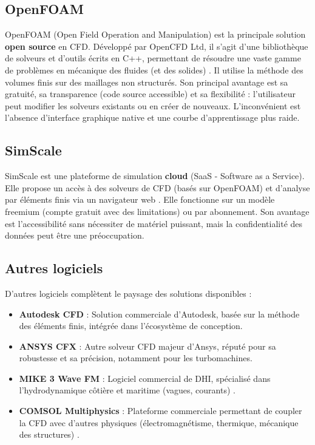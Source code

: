\subsection{OpenFOAM}
\label{subsec:openfoam}

OpenFOAM (Open Field Operation and Manipulation) est la principale solution \textbf{open source} en CFD. Développé par OpenCFD Ltd, il s'agit d'une bibliothèque de solveurs et d'outils écrits en C++, permettant de résoudre une vaste gamme de problèmes en mécanique des fluides (et des solides) \cite{weller1998tensorial, jasak2009openfoam}. Il utilise la méthode des volumes finis sur des maillages non structurés. Son principal avantage est sa gratuité, sa transparence (code source accessible) et sa flexibilité : l'utilisateur peut modifier les solveurs existants ou en créer de nouveaux. L'inconvénient est l'absence d'interface graphique native et une courbe d'apprentissage plus raide.

\subsection{SimScale}
\label{subsec:simscale}

SimScale est une plateforme de simulation \textbf{cloud} (SaaS - Software as a Service). Elle propose un accès à des solveurs de CFD (basés sur OpenFOAM) et d'analyse par éléments finis via un navigateur web \cite{simscale2021documentation, bletzinger2017cloud}. Elle fonctionne sur un modèle freemium (compte gratuit avec des limitations) ou par abonnement. Son avantage est l'accessibilité sans nécessiter de matériel puissant, mais la confidentialité des données peut être une préoccupation.

\subsection{Autres logiciels}
\label{subsec:autres_logiciels}

D'autres logiciels complètent le paysage des solutions disponibles :
\begin{itemize}
    \item \textbf{Autodesk CFD} : Solution commerciale d'Autodesk, basée sur la méthode des éléments finis, intégrée dans l'écosystème de conception.
    \item \textbf{ANSYS CFX} : Autre solveur CFD majeur d'Ansys, réputé pour sa robustesse et sa précision, notamment pour les turbomachines.
    \item \textbf{MIKE 3 Wave FM} : Logiciel commercial de DHI, spécialisé dans l'hydrodynamique côtière et maritime (vagues, courants) \cite{dhi2020mike}.
    \item \textbf{COMSOL Multiphysics} : Plateforme commerciale permettant de coupler la CFD avec d'autres physiques (électromagnétisme, thermique, mécanique des structures) \cite{comsol2021reference}.
\end{itemize}

